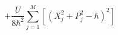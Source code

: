 \documentclass{article}
\begin{document}
\[+ \frac{U}{8\hbar^2}\sum\limits_{j=1}^M \left[ (X_j^2 + P_j^2 - \hbar)^2 \right]
\]
\end{document}
